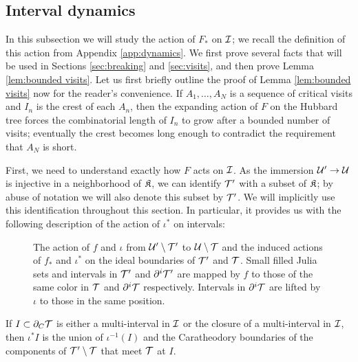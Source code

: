 \documentclass[12pt]{amsart}
\begin{document}
\subsection{Interval dynamics}\label{sec:intervals}



In this subsection we will study the action of $F_*$ on $\mathcal I$; {we recall the definition of this action from Appendix \ref{app:dynamics}}.  We first prove several facts that will be used in Sections \ref{sec:breaking} and \ref{sec:visits}, and then prove Lemma \ref{lem:bounded visits}.
{Let us first briefly outline the proof of Lemma \ref{lem:bounded visits} now for the reader's convenience. If $A_1, \dots, A_N$ is a sequence of critical visits and $I_n$ is the crest of each $A_n$, then the expanding action of $F$ on the Hubbard tree forces the combinatorial length of $I_n$ to grow after a bounded number of visits; eventually the crest becomes long enough to contradict the requirement that $A_N$ is short.}


First, we need to understand exactly how $F$ acts on $\mathcal I$. 
As the immersion $\mathcal U'\to \mathcal U$ is injective in a neighborhood of $\mathfrak{K}$, we can identify $\mathcal T'$ with a subset of $\mathfrak{K}$; by abuse of notation we will also denote this subset by $\mathcal T'$.
We will implicitly use this identification throughout this section. 
In particular, it provides us with the following description of the action of $\iota^*$ on intervals:

\begin{figure}
	\begin{center}
		\def\svgwidth{5.5in}
		
		\caption{The action of $f$ and $\iota$ from $\mathcal U'\setminus \mathcal T'$ to $\mathcal U\setminus \mathcal T$ and the induced actions of $f_*$ and $\iota^*$ on the ideal boundaries of $\mathcal T'$ and $\mathcal T$. Small filled Julia sets and intervals in $\mathcal T'$ and $\partial^i \mathcal T'$ are mapped by $f$ to those of the same color in $\mathcal T$ and $\partial^i\mathcal T$ respectively. Intervals in $\partial^i \mathcal T$ are lifted by $\iota$ to those in the same position.}
		\label{fig:dynamic-intervals}
	\end{center}
\end{figure}

\begin{prop}\label{prop:pullback description}
    If $I\subset \partial_C \mathcal T$ is either a multi-interval in $\mathcal I$ or the closure of a multi-interval in $\mathcal I$, then $\iota^*I$ is the union of $\iota^{-1}(I)$ and the Caratheodory boundaries of the components of $\mathcal T'\setminus \mathcal T$ that meet $\mathcal T$ at $I$.
\end{prop}
\end{document}
